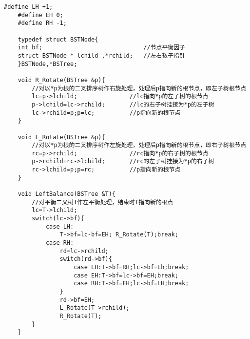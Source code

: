 \documentclass[UTF8]{ctexart}
\begin{document}
\begin{lstlisting}[style=v1]
    #define LH +1;
    #define EH 0;
    #define RH -1;

    typedef struct BSTNode{
    int bf;                             //节点平衡因子
    struct BSTNode * lchild ,*rchild;   //左右孩子指针
    }BSTNode,*BSTree;

    void R_Rotate(BSTree &p){
        //对以*p为根的二叉排序树作右旋处理，处理后p指向新的根节点，即左子树根节点
        lc=p->lchild;               //lc指向*p的左子树的根节点
        p->lchild=lc->rchild;       //lc的右子树挂接为*p的左子树    
        lc->rchild=p;p=lc;          //p指向新的根节点
    }

    void L_Rotate(BSTree &p){
        //对以*p为根的二叉排序树作左旋处理，处理后p指向新的根节点，即右子树根节点
        rc=p->rchild;               //rc指向*p的右子树的根节点
        p->rchild=rc->lchild;       //rc的左子树挂接为*p的右子树    
        rc->lchild=p;p=rc;          //p指向新的根节点
    }

    void LeftBalance(BSTree &T){
        //对平衡二叉树T作左平衡处理，结束时T指向新的根点
        lc=T->lchild;
        switch(lc->bf){
            case LH:
                T->bf=lc-bf=EH; R_Rotate(T);break;
            case RH:
                rd=lc->rchild;
                switch(rd->bf){
                    case LH:T->bf=RH;lc->bf=Eh;break;
                    case EH:T->bf=lc->bf=EH;break;
                    case RH:T->bf=EH;lc->bf=LH;break;
                }
                rd->bf=EH;
                L_Rotate(T->rchild);
                R_Rotate(T);
        }
    }



\end{lstlisting}

\newpage
\end{document}
